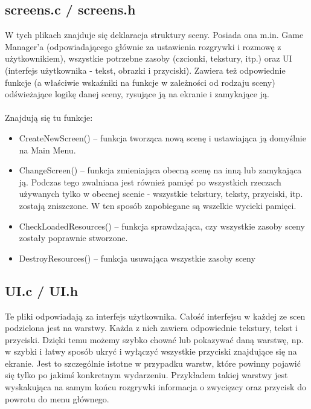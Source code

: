 \documentclass[11pt]{article}
\begin{document}
		\subsection{screens.c / screens.h}
		\noindent W tych plikach znajduje się deklaracja struktury sceny. Posiada ona m.in. Game Manager'a (odpowiadającego głównie za ustawienia rozgrywki i rozmowę z użytkownikiem), wszystkie potrzebne zasoby (czcionki, tekstury, itp.) oraz UI (interfejs użytkownika - tekst, obrazki i przyciski). Zawiera też odpowiednie funkcje (a właściwie wskaźniki na funkcje w zależności od rodzaju sceny) odświeżające logikę danej sceny, rysujące ją na ekranie i zamykające ją.
		\\
		\\
		\noindent Znajdują się tu funkcje:

		\begin{itemize}
			\item CreateNewScreen() -- funkcja tworząca nową scenę i ustawiająca ją domyślnie na Main Menu.
			\item ChangeScreen() -- funkcja zmieniająca obecną scenę na inną lub zamykająca ją. Podczas tego zwalniana jest również pamięć po wszystkich rzeczach używanych tylko w obecnej scenie - wszystkie tekstury, teksty, przyciski, itp. zostają zniszczone. W ten sposób zapobiegane są wszelkie wycieki pamięci.
			\item CheckLoadedResources() -- funkcja sprawdzająca, czy wszystkie zasoby sceny zostały poprawnie stworzone.
			\item DestroyResources() -- funkcja usuwająca wszystkie zasoby sceny
		\end{itemize}

		\subsection{UI.c / UI.h}
		\noindent Te pliki odpowiadają za interfejs użytkownika. Całość interfejsu w każdej ze scen podzielona jest na warstwy. Każda z nich zawiera odpowiednie tekstury, tekst i przyciski. Dzięki temu możemy szybko chować lub pokazywać daną warstwę, np. w szybki i łatwy sposób ukryć i wyłączyć wszystkie przyciski znajdujące się na ekranie. Jest to szczególnie istotne w przypadku warstw, które powinny pojawić się tylko po jakimś konkretnym wydarzeniu. Przykładem takiej warstwy jest wyskakująca na samym końcu rozgrywki informacja o zwycięzcy oraz przycisk do powrotu do menu głównego.
\end{document}
